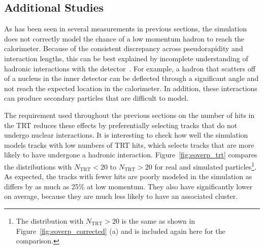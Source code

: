\subsection{Additional Studies}
\label{sec:additional}

As has been seen in several measurements in previous sections, the simulation does not correctly model the chance of a low momentum hadron to reach the calorimeter.
Because of the consistent discrepancy across pseudorapidity and interaction lengths, this can be best explained by incomplete understanding of hadronic interactions with the detector~\cite{PERF-2015-05}.
For example, a hadron that scatters off of a nucleus in the inner detector can be deflected through a significant angle and not reach the expected location in the calorimeter.
In addition, these interactions can produce secondary particles that are difficult to model.

The requirement used throughout the previous sections  on the number of hits in the \ac{TRT} reduces these effects by preferentially selecting tracks that do not undergo nuclear interactions.
It is interesting to check how well the simulation models tracks with low numbers of \ac{TRT} hits, which selects tracks that are more likely to have undergone a hadronic interaction.
Figure~\ref{fig:eoverp_trt} compares the distributions with $N_{\mathrm{TRT}} < 20$ to $N_{\mathrm{TRT}} > 20$ for real and simulated particles\footnote{The distribution with $N_{\mathrm{TRT}} > 20$ is the same as shown in Figure~\ref{fig:eoverp_corrected} (a) and is included again here for the comparison.}.
As expected, the tracks with fewer hits are poorly modeled in the simulation as \epcor differs by as much as 25\% at low momentum.
They also have significantly lower \epcor on average, because they are much less likely to have an associated cluster.

